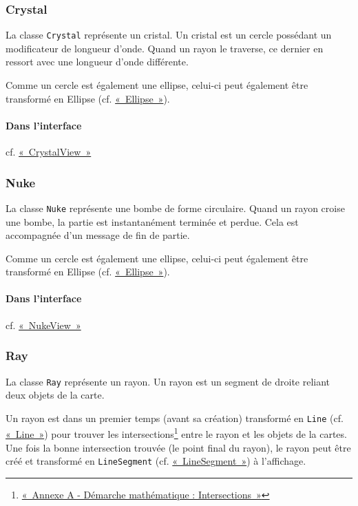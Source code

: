 \documentclass[]{report}
\begin{document}
\subsubsection{\label{Crystal}Crystal}

La classe \texttt{Crystal} représente un cristal. Un cristal est un cercle
possédant un modificateur de longueur d'onde. Quand un rayon le traverse, ce dernier
en ressort avec une longueur d'onde différente. 

Comme un cercle est également une ellipse, celui-ci peut également être transformé en Ellipse (cf. \hyperref[Ellipse]{«~Ellipse~»}).

\paragraph{Dans l'interface} cf. \hyperref[CrystalView]{«~CrystalView~»}

\subsubsection{\label{Nuke}Nuke}

La classe \texttt{Nuke} représente une bombe de forme circulaire.
Quand un rayon croise une bombe, la partie est instantanément terminée et perdue. Cela est accompagnée
d'un message de fin de partie.

Comme un cercle est également une ellipse, celui-ci peut également être transformé en Ellipse (cf. \hyperref[Ellipse]{«~Ellipse~»}).

\paragraph{Dans l'interface} cf. \hyperref[NukeView]{«~NukeView~»}

\subsubsection{\label{Ray}Ray}

La classe \texttt{Ray} représente un rayon. Un rayon est un segment de droite reliant
deux objets de la carte. 

Un rayon est dans un premier temps (avant sa création) transformé en \texttt{Line} (cf. \hyperref[Line]{«~Line~»}) pour
trouver les intersections\footnote{\hyperref[AnnexeIntersects]{«~Annexe A - Démarche mathématique : Intersections~»}} entre le rayon et les objets de la cartes. Une fois la bonne intersection trouvée (le point final du rayon), le rayon peut être créé et 
transformé en \texttt{LineSegment} (cf. \hyperref[LineSegment]{«~LineSegment~»}) à l'affichage.
\end{document}
